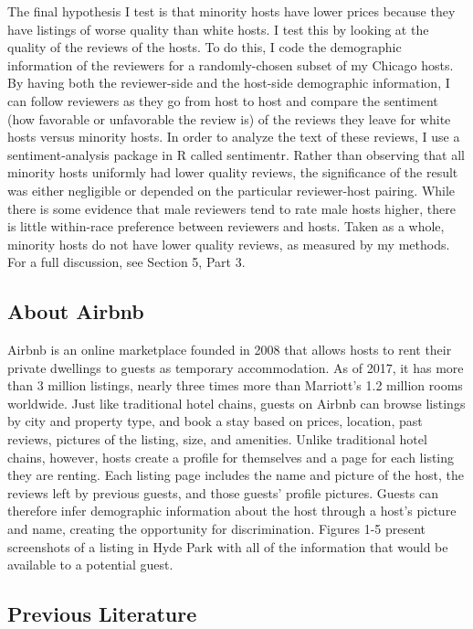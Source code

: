The final hypothesis I test is that minority hosts have lower prices because they have listings of worse quality than white hosts. I test this by looking at the quality of the reviews of the hosts. To do this, I code the demographic information of the reviewers for a randomly-chosen subset of my Chicago hosts. By having both the reviewer-side and the host-side demographic information, I can follow reviewers as they go from host to host and compare the sentiment (how favorable or unfavorable the review is) of the reviews they leave for white hosts versus minority hosts. In order to analyze the text of these reviews, I use a sentiment-analysis package in R called sentimentr.\cite{sentimentr} Rather than observing that all minority hosts uniformly had lower quality reviews, the significance of the result was either negligible or depended on the particular reviewer-host pairing. While there is some evidence that male reviewers tend to rate male hosts higher, there is little within-race preference between reviewers and hosts. Taken as a whole, minority hosts do not have lower quality reviews, as measured by my methods. For a full discussion, see Section 5, Part 3. 






\subsection{About Airbnb} %
Airbnb is an online marketplace founded in 2008 that allows hosts to rent their private dwellings to guests as temporary accommodation. As of 2017, it has more than 3 million listings, nearly three times more than Marriott's 1.2 million rooms worldwide.\cite{aboutus} Just like traditional hotel chains, guests on Airbnb can browse listings by city and property type, and book a stay based on prices, location, past reviews, pictures of the listing, size, and amenities. Unlike traditional hotel chains, however, hosts create a profile for themselves and a page for each listing they are renting. Each listing page includes the name and picture of the host, the reviews left by previous guests, and those guests' profile pictures. Guests can therefore infer demographic information about the host through a host's picture and name, creating the opportunity for discrimination. Figures 1-5 present screenshots of a listing in Hyde Park with all of the information that would be available to a potential guest. 


\subsection{Previous Literature} %

